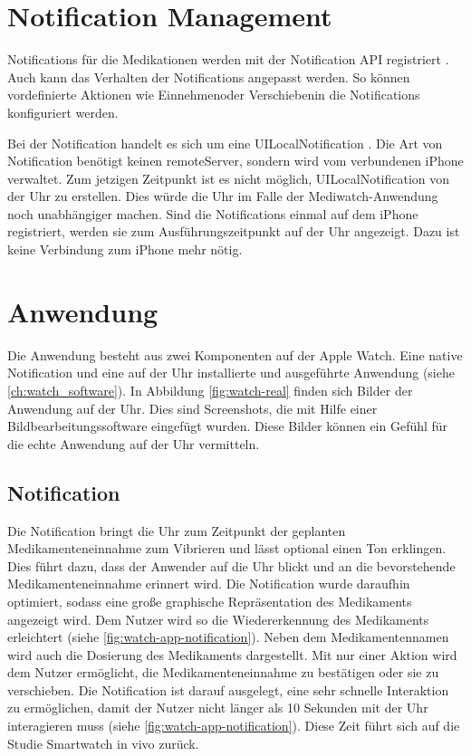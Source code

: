 \section{Notification Management}
Notifications für die Medikationen werden mit der Notification API  registriert \cite{Apple:2015notif}. Auch kann das Verhalten der Notifications angepasst werden. So können vordefinierte Aktionen wie \glqq Einnehmen\grqq  oder \glqq Verschieben\grqq in die Notifications konfiguriert werden.

Bei der Notification handelt es sich um eine UILocalNotification \cite{Apple:2015notif}. Die Art von Notification benötigt keinen \gls{remoteServer}, sondern wird vom verbundenen iPhone verwaltet. Zum jetzigen Zeitpunkt ist es nicht möglich, UILocalNotification von der Uhr zu erstellen. Dies würde die Uhr im Falle der Mediwatch-Anwendung noch unabhängiger machen. Sind die Notifications einmal auf dem iPhone registriert, werden sie zum Ausführungszeitpunkt auf der Uhr angezeigt. Dazu ist keine Verbindung zum iPhone mehr nötig.

\section{Anwendung}

Die Anwendung besteht aus zwei Komponenten auf der Apple Watch. Eine native Notification und eine auf der Uhr installierte und ausgeführte Anwendung (siehe \ref{ch:watch_software}). In Abbildung \ref{fig:watch-real} finden sich Bilder der Anwendung auf der Uhr. Dies sind Screenshots, die mit Hilfe einer Bildbearbeitungssoftware eingefügt wurden. Diese Bilder können ein Gefühl für die echte Anwendung auf der Uhr vermitteln.

\subsection{Notification}
Die Notification bringt die Uhr zum Zeitpunkt der geplanten Medikamenteneinnahme zum Vibrieren und lässt optional einen Ton erklingen. Dies führt dazu, dass der Anwender auf die Uhr blickt und an die bevorstehende Medikamenteneinnahme erinnert wird. Die Notification wurde daraufhin optimiert, sodass eine große graphische Repräsentation des Medikaments angezeigt wird. Dem Nutzer wird so die Wiedererkennung des Medikaments erleichtert (siehe \ref{fig:watch-app-notification}). Neben dem Medikamentennamen wird auch die Dosierung des Medikaments dargestellt. Mit nur einer Aktion wird dem Nutzer ermöglicht, die Medikamenteneinnahme zu bestätigen oder sie zu verschieben. Die Notification ist darauf ausgelegt, eine sehr schnelle Interaktion zu ermöglichen, damit der Nutzer nicht länger als 10 Sekunden mit der Uhr interagieren muss (siehe \ref{fig:watch-app-notification}). Diese Zeit führt sich auf die Studie \glqq Smartwatch in vivo\glqq \cite{Pizza:2016} zurück.
 
